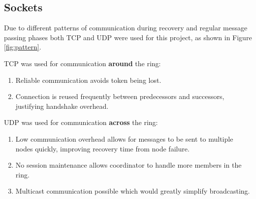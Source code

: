\documentclass[12pt]{article}
\begin{document}
\subsection{Sockets}

Due to different patterns of communication during recovery and regular message passing phases both TCP and UDP were used for this project, as shown in Figure \ref{fig:pattern}.

\noindent TCP was used for communication \textbf{around} the ring:
\begin{enumerate}
    \item Reliable communication avoids token being lost.
    \item Connection is reused frequently between predecessors and successors, justifying handshake overhead.
\end{enumerate}

\noindent UDP was used for communication \textbf{across} the ring: 
\begin{enumerate}
    \item Low communication overhead allows for messages to be sent to multiple nodes quickly, improving recovery time from node failure.
    \item No session maintenance allows coordinator to handle more members in the ring.
    \item Multicast communication possible which would greatly simplify broadcasting.
\end{enumerate}
\end{document}

